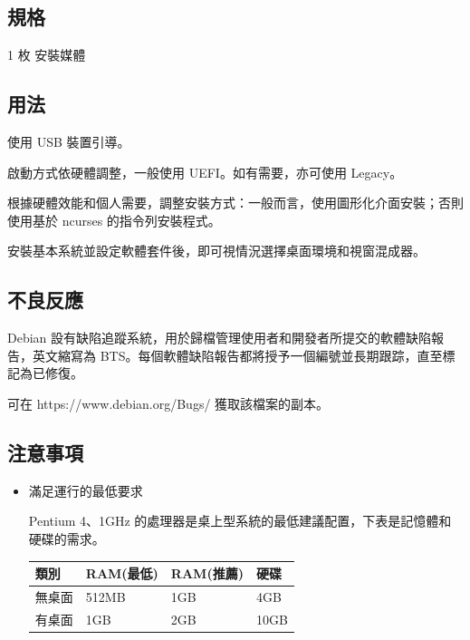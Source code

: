 \documentclass{article}
\begin{document}
\begin{multicols*}{3}
	\begin{tcolorbox}
	\section*{規格}
	\end{tcolorbox}

	1 枚 安裝媒體

	\medskip

	\begin{tcolorbox}
	\section*{用法}
	\end{tcolorbox}

	使用 USB 裝置引導。

	啟動方式依硬體調整，一般使用 UEFI。如有需要，亦可使用 Legacy。

	根據硬體效能和個人需要，調整安裝方式：一般而言，使用圖形化介面安裝；否則使用基於 ncurses 的指令列安裝程式。

	安裝基本系統並設定軟體套件後，即可視情況選擇桌面環境和視窗混成器。

	\medskip

	\begin{tcolorbox}
	\section*{不良反應}
	\end{tcolorbox}

	Debian 設有缺陷追蹤系統，用於歸檔管理使用者和開發者所提交的軟體缺陷報告，英文縮寫為 BTS。每個軟體缺陷報告都將授予一個編號並長期跟踪，直至標記為已修復。

	可在 https://www.debian.org/Bugs/ 獲取該檔案的副本。

	\medskip


	\begin{tcolorbox}
	\section*{注意事項}
	\end{tcolorbox}
	\begin{itemize}[leftmargin=*]

		\item 滿足運行的最低要求

		Pentium 4、1GHz 的處理器是桌上型系統的最低建議配置，下表是記憶體和硬碟的需求。

		{\small\begin{tabularx}{\linewidth}{|X|X|X|X|}
			\hline
			類別 & RAM\newline (最低) & RAM\newline (推薦) & 硬碟 \\
			\hline
			無桌面 & 512MB & 1GB & 4GB \\
			\hline
			有桌面 & 1GB & 2GB & 10GB \\
			\hline
		\end{tabularx}}


\end{itemize}
\end{multicols*}
\end{document}

